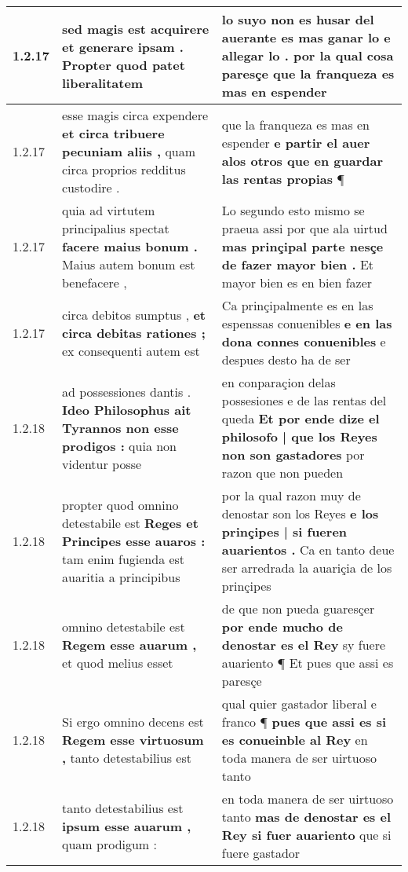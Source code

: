 \begin{tabular}{|p{1cm}|p{6.5cm}|p{6.5cm}|}
1.2.17 & sed magis est acquirere \textbf{ et generare ipsam . } Propter quod patet liberalitatem & lo suyo non es husar del auerante es mas ganar lo e allegar lo . \textbf{ por la qual cosa paresçe } que la franqueza es mas en espender \\\hline
1.2.17 & esse magis circa expendere \textbf{ et circa tribuere pecuniam aliis , } quam circa proprios redditus custodire . & que la franqueza es mas en espender \textbf{ e partir el auer alos otros que en guardar las rentas propias } ¶ \\\hline
1.2.17 & quia ad virtutem principalius spectat \textbf{ facere maius bonum . } Maius autem bonum est benefacere , & Lo segundo esto mismo se praeua assi por que ala uirtud \textbf{ mas prinçipal parte nesçe de fazer mayor bien . } Et mayor bien es en bien fazer \\\hline
1.2.17 & circa debitos sumptus , \textbf{ et circa debitas rationes ; } ex consequenti autem est & Ca prinçipalmente es en las espenssas conuenibles \textbf{ e en las dona connes conuenibles } e despues desto ha de ser \\\hline
1.2.18 & ad possessiones dantis . \textbf{ Ideo Philosophus ait Tyrannos non esse prodigos : } quia non videntur posse & en conparaçion delas possesiones e de las rentas del queda \textbf{ Et por ende dize el philosofo | que los Reyes non son gastadores } por razon que non pueden \\\hline
1.2.18 & propter quod omnino detestabile est \textbf{ Reges et Principes esse auaros : } tam enim fugienda est auaritia a principibus & por la qual razon muy de denostar son los Reyes \textbf{ e los prinçipes | si fueren auarientos . } Ca en tanto deue ser arredrada la auariçia de los prinçipes \\\hline
1.2.18 & omnino detestabile est \textbf{ Regem esse auarum , } et quod melius esset & de que non pueda guaresçer \textbf{ por ende mucho de denostar es el Rey } sy fuere auariento ¶ Et pues que assi es paresçe \\\hline
1.2.18 & Si ergo omnino decens est \textbf{ Regem esse virtuosum , } tanto detestabilius est & qual quier gastador liberal e franco ¶ \textbf{ pues que assi es si es conueinble al Rey } en toda manera de ser uirtuoso tanto \\\hline
1.2.18 & tanto detestabilius est \textbf{ ipsum esse auarum , } quam prodigum : & en toda manera de ser uirtuoso tanto \textbf{ mas de denostar es el Rey si fuer auariento } que si fuere gastador \\\hline

\end{tabular}
